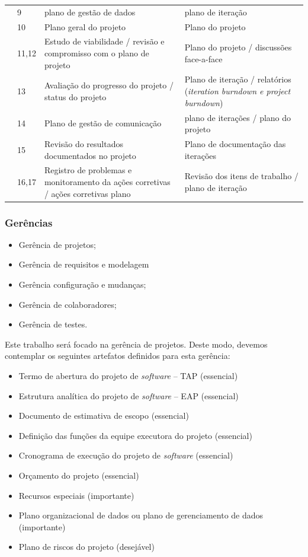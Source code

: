 \documentclass{acm_proc_article-sp}
\begin{document}
\begin{table}[h]
\begin{tabular}{|p{20mm}|p{10mm}|p{60mm}|p{60mm}|}
& 9 & plano de gestão de dados & plano de iteração \\
& 10 & Plano geral do projeto & Plano do projeto \\
& 11,12 & Estudo de viabilidade / revisão e compromisso com o plano de projeto & Plano do projeto / discussões face-a-face \\
& 13 & Avaliação do progresso do projeto / status do projeto & Plano de iteração / relatórios (\textit{iteration burndown
e project burndown})\\
& 14 & Plano de gestão de comunicação & plano de iterações / plano do projeto \\
& 15 & Revisão do resultados documentados no projeto & Plano de documentação das iterações \\
& 16,17 & Registro de problemas e monitoramento da ações corretivas / ações corretivas plano & Revisão dos itens de trabalho / plano de iteração \\

\hline
\end{tabular}
\end{table}

\subsubsection*{Gerências}

\begin{itemize}
\item Gerência de projetos;
\item Gerência de requisitos e modelagem
\item Gerência configuração e mudanças;
\item Gerência de colaboradores;
\item Gerência de testes.
\end{itemize}

Este trabalho será focado na gerência de projetos. Deste modo, devemos contemplar os seguintes artefatos definidos para esta gerência:

\begin{itemize}
\item Termo de abertura do  projeto de \textit{software} – TAP (essencial)
\item Estrutura analítica do projeto de \textit{software} – EAP (essencial)
\item Documento de estimativa de escopo (essencial)
\item Definição das funções da equipe executora do projeto (essencial)
\item Cronograma de execução do projeto de \textit{software} (essencial)
\item Orçamento do projeto (essencial)
\item Recursos especiais (importante)
\item Plano organizacional de dados ou plano de gerenciamento de dados  (importante)
\item Plano de riscos do projeto (desejável)
\end{itemize}
\end{document}

